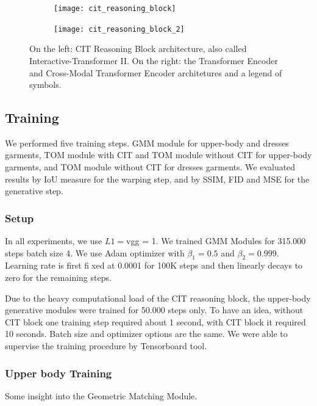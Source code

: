 \FloatBarrier
\begin{figure}[h]
\centering
\begin{subfigure}{0.7\linewidth}
  \centering
  \texttt{[image: cit\_reasoning\_block]}
  \label{fig:sub1}
\end{subfigure}%
\begin{subfigure}{0.3\linewidth}
  \centering
  \texttt{[image: cit\_reasoning\_block\_2]}
  \label{fig:sub2}
\end{subfigure}
\caption{On the left: CIT Reasoning Block architecture, also called Interactive-Transformer II. On the right: the Transformer Encoder and Cross-Modal Transformer Encoder architetures and a legend of symbols.}
\label{fig:cit_architecture}
\end{figure}
\FloatBarrier

\subsection{Training}
We performed five training steps. GMM module for upper-body and dresses garments, TOM module with CIT and TOM module without CIT for upper-body garments, and TOM module without CIT for dresses garments. We evaluated results by IoU measure for the warping step, and by SSIM, FID and MSE for the generative step.
\subsubsection{Setup}
In all experiments, we use $L1 = $vgg = 1. We trained GMM Modules for 315.000 steps batch size 4. We use Adam optimizer with $\beta_1 = 0.5$ and $\beta_2 = 0.999$. Learning rate is first fixed at 0.0001 for 100K steps and then linearly decays to zero for the remaining steps.

Due to the heavy computational load of the CIT reasoning block, the upper-body generative modules were trained for 50.000 steps only. To have an idea, without CIT block one training step required about 1 second, with CIT block it required 10 seconds. Batch size and optimizer options are the same.
We were able to supervise the training procedure by Tensorboard tool.

\subsubsection{Upper body Training}

Some insight into the Geometric Matching Module.

